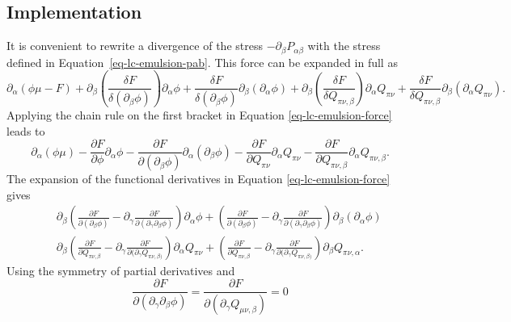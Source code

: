 \subsection{Implementation}

It is convenient \cite{sulaiman2006} to rewrite a divergence of the
stress  $-\partial_\beta P_{\alpha\beta}$ with the stress defined in
Equation~\ref{eq-lc-emulsion-pab}. This force can be expanded in full as
\begin{equation}
\partial_{\alpha}\left(\phi\mu - F\right)
+\partial_{\beta} \left(\frac{\delta F}{\delta \left(\partial_{\beta}\phi\right)}\right)\partial_{\alpha}\phi
+\frac{\delta F}{\delta \left(\partial_{\beta}\phi\right)}\partial_{\beta}\left(\partial_{\alpha}\phi\right)
+\partial_{\beta}\left(\frac{\delta F}{\delta Q_{\pi\nu,\beta}}\right)
 \partial_{\alpha} Q_{\pi\nu}
+\frac{\delta F}{\delta Q_{\pi\nu,\beta}} \partial_{\beta}\left(\partial_{\alpha} Q_{\pi\nu}\right).
\label{eq-lc-emulsion-force}
\end{equation}
Applying the chain rule on the first bracket in Equation \ref{eq-lc-emulsion-force} leads to
\begin{equation}
\partial_{\alpha}(\phi\mu) 
- \frac{\partial F}{\partial \phi} \partial_\alpha \phi
- \frac{\partial F}{\partial(\partial_\beta \phi)} \partial_\alpha (\partial_\beta\phi)
- \frac{\partial F}{\partial Q_{\pi\nu}} \partial_\alpha Q_{\pi\nu}  
- \frac{\partial F}{\partial Q_{\pi\nu,\beta}} \partial_\alpha Q_{\pi\nu,\beta}\nonumber.
\end{equation}
The expansion of the functional derivatives in Equation \ref{eq-lc-emulsion-force} gives
\begin{eqnarray}
&&\partial_{\beta} \left(\frac{\partial F}{\partial (\partial_{\beta}\phi)} - \partial_\gamma \frac{\partial F}{\partial (\partial_\gamma\partial_\beta\phi)}\right) \partial_{\alpha}\phi
+\left(\frac{\partial F}{\partial (\partial_{\beta}\phi)} - \partial_\gamma \frac{\partial F}{\partial (\partial_\gamma\partial_\beta\phi)}\right) \partial_\beta\left(\partial_{\alpha}\phi\right)\nonumber\\
&&\partial_{\beta} \left(\frac{\partial F}{\partial Q_{\pi\nu,\beta}} - \partial_\gamma \frac{\partial F}{\partial (\partial_\gamma Q_{\pi\nu,\beta)}}\right) \partial_{\alpha}Q_{\pi\nu}
+ \left(\frac{\partial F}{\partial Q_{\pi\nu,\beta}} - \partial_\gamma \frac{\partial F}{\partial (\partial_\gamma Q_{\pi\nu,\beta)}}\right) \partial_\beta Q_{\pi\nu,\alpha}\nonumber.
\end{eqnarray}
Using the symmetry of partial derivatives and $$\frac{\partial F}{\partial (\partial_\gamma\partial_\beta\phi)} = \frac{\partial F}{\partial (\partial_\gamma Q_{\mu\nu,\beta})}=0$$
